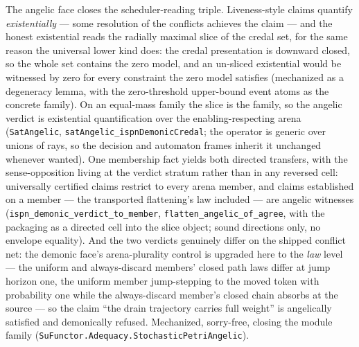 The angelic face closes the scheduler-reading triple.  Liveness-style
claims quantify \emph{existentially} --- some resolution of the
conflicts achieves the claim --- and the honest existential reads the
radially maximal slice of the credal set, for the same reason the
universal lower kind does: the credal presentation is downward
closed, so the whole set contains the zero model, and an un-sliced
existential would be witnessed by zero for every constraint the zero
model satisfies (mechanized as a degeneracy lemma, with the
zero-threshold upper-bound event atoms as the concrete family).  On
an equal-mass family the slice is the family, so the angelic verdict
is existential quantification over the enabling-respecting arena
(\texttt{SatAngelic}, \texttt{satAngelic\_ispnDemonicCredal}; the
operator is generic over unions of rays, so the decision and
automaton frames inherit it unchanged whenever wanted).  One
membership fact yields both directed transfers, with the
sense-opposition living at the verdict stratum rather than in any
reversed cell: universally certified claims restrict to every arena
member, and claims established on a member --- the transported
flattening's law included --- are angelic witnesses
(\texttt{ispn\_demonic\_verdict\_to\_member},
\texttt{flatten\_angelic\_of\_agree}, with the packaging as a
directed cell into the slice object; sound directions only, no
envelope equality).  And the two verdicts genuinely differ on the
shipped conflict net: the demonic face's arena-plurality control is
upgraded here to the \emph{law} level --- the uniform and
always-discard members' closed path laws differ at jump horizon one,
the uniform member jump-stepping to the moved token with probability
one while the always-discard member's closed chain absorbs at the
source --- so the claim ``the drain trajectory carries full weight''
is angelically satisfied and demonically refused.  Mechanized,
sorry-free, closing the module family
(\texttt{SuFunctor.Adequacy.StochasticPetriAngelic}).

